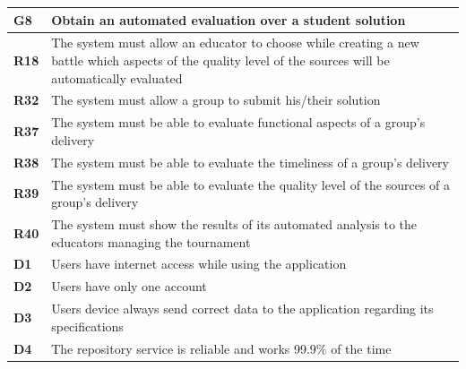 \documentclass[../RASD.tex]{subfiles}
\begin{document}
        \begin{table}[ht]
            \begin{center}
                \begin{tabular}{|m{2em}|m{30em}|}
                \hline
                \rowcolor{ReqMappingRow1}
                \textbf{G8} & \textbf{Obtain an automated evaluation over a student solution}\\
                \hline
                \cellcolor{ReqMappingCell2}
                \textbf{R18} & The system must allow an educator to choose while creating a new battle which aspects of the quality level of the sources will be automatically evaluated\\
                \hline
                \cellcolor{ReqMappingCell2}
                \textbf{R32} & The system must allow a group to submit his/their solution\\
                \hline
                \cellcolor{ReqMappingCell2}
                \textbf{R37} & The system must be able to evaluate functional aspects of a group's delivery\\
                \hline
                \cellcolor{ReqMappingCell2}
                \textbf{R38} & The system must be able to evaluate the timeliness of a group's delivery\\
                \hline
                \cellcolor{ReqMappingCell2}
                \textbf{R39} & The system must be able to evaluate the quality level of the sources of a group's delivery\\
                \hline
                \cellcolor{ReqMappingCell2}
                \textbf{R40} & The system must show the results of its automated analysis to the educators managing the tournament\\
                \hline
                \cellcolor{ReqMappingCell3}
                \textbf{D1} & Users have internet access while using the application\\
                \hline
                \cellcolor{ReqMappingCell3}
                \textbf{D2} & Users have only one account\\
                \hline
                \cellcolor{ReqMappingCell3}
                \textbf{D3} & Users device always send correct data to the application regarding its specifications\\
                \hline
                \cellcolor{ReqMappingCell3}
                \textbf{D4} & The repository service is reliable and works 99.9\% of the time\\

\end{tabular}
\end{center}
\end{table}
\end{document}
